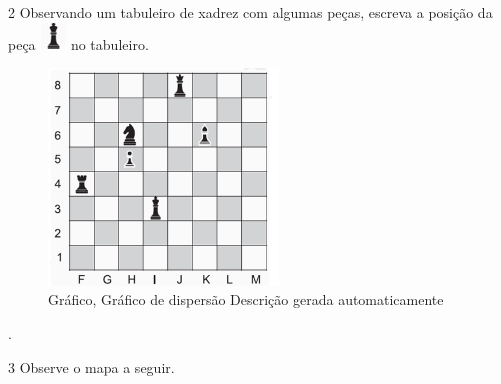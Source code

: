 \begin{escolha}
\begin{boxmedio}
\begin{boxmedio}
{\begin{boxpeq}
\begin{boxpeq}
{\begin{boxpeq}
\begin{boxmedio}
\begin{boxmedio}
\begin{boxpeq}
\begin{boxmedio}
\begin{boxpeq}
\begin{boxpeq}
\begin{boxpeq}
\begin{boxpeq}
\begin{boxmedio}
{\begin{boxmedio}
\begin{boxmedio}
\begin{boxpeq}
\begin{boxmedio}
\begin{boxpeq}
\begin{boxpeq}
\begin{boxpeq}
\begin{escolha}
{\begin{boxmedio}
\begin{boxpeq}
\begin{boxpeq}
\begin{boxpeq}
\begin{boxpeq}
\begin{boxpeq}
\begin{boxmedio}
\begin{boxpeq}
\begin{boxpeq}
\begin{boxpeq}
{\begin{boxpeq}
\begin{boxmedio}
\begin{boxpeq}
\begin{boxpeq}
\begin{boxpeq}
{\begin{boxpeq}
\begin{boxmedio}
{\begin{boxpeq}
\begin{boxpeq}
\begin{boxmedio}
\begin{boxmedio}
\begin{boxpeq}
\begin{boxpeq}
{\begin{boxpeq}
\begin{boxpeq}
\begin{boxpeq}
\begin{boxpeq}
\begin{boxpeq}
\begin{escolha}
\begin{escolha}
{\begin{boxmedio}
\begin{boxpeq}
\begin{q°}
\begin{boxmedio}
\begin{boxpeq}
\begin{boxpeq}
\begin{boxmedio}
\begin{boxmedio}
\begin{boxmedio}
\num{2} Observando um tabuleiro de xadrez com algumas peças, escreva a posição
da peça
\includegraphics[width=0.27083in,height=0.27639in]{./_SAEB_9_MAT/media/image198.png}
no tabuleiro.

\begin{figure}
\centering
\includegraphics[width=2.40278in,height=2.27161in]{./_SAEB_9_MAT/media/image199.png}
\caption{Gráfico, Gráfico de dispersão Descrição gerada automaticamente}
\end{figure}


.

\num{3} Observe o mapa a seguir.


\end{boxmedio}
\end{boxmedio}
\end{boxmedio}
\end{boxpeq}
\end{boxpeq}
\end{boxmedio}
\end{q°}
\end{boxpeq}
\end{boxmedio}}
\end{escolha}
\end{escolha}
\end{boxpeq}
\end{boxpeq}
\end{boxpeq}
\end{boxpeq}
\end{boxpeq}}
\end{boxpeq}
\end{boxpeq}
\end{boxmedio}
\end{boxmedio}
\end{boxpeq}
\end{boxpeq}}
\end{boxmedio}
\end{boxpeq}}
\end{boxpeq}
\end{boxpeq}
\end{boxpeq}
\end{boxmedio}
\end{boxpeq}}
\end{boxpeq}
\end{boxpeq}
\end{boxpeq}
\end{boxmedio}
\end{boxpeq}
\end{boxpeq}
\end{boxpeq}
\end{boxpeq}
\end{boxpeq}
\end{boxmedio}}
\end{escolha}
\end{boxpeq}
\end{boxpeq}
\end{boxpeq}
\end{boxmedio}
\end{boxpeq}
\end{boxmedio}
\end{boxmedio}}
\end{boxmedio}
\end{boxpeq}
\end{boxpeq}
\end{boxpeq}
\end{boxpeq}
\end{boxmedio}
\end{boxpeq}
\end{boxmedio}
\end{boxmedio}
\end{boxpeq}}
\end{boxpeq}
\end{boxpeq}}
\end{boxmedio}
\end{boxmedio}
\end{escolha}
